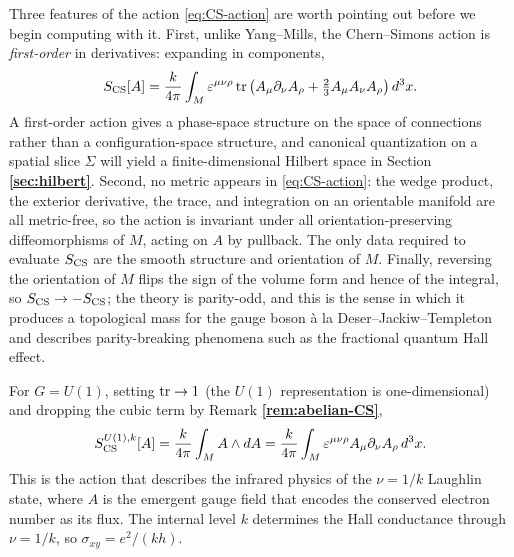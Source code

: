 \noindent Three features of the action \eqref{eq:CS-action} are worth pointing out before we begin computing with it. First, unlike Yang--Mills, the Chern--Simons action is \emph{first-order} in derivatives: expanding in components,
\begin{equation}\label{eq:CS-components}
S_{\operatorname{CS}}[A] = \frac{k}{4\pi}\int_M \varepsilon^{\mu\nu\rho}\operatorname{tr}\left(A_\mu \partial_\nu A_\rho + \tfrac{2}{3}A_\mu A_\nu A_\rho\right)d^3 x.
\end{equation}
A first-order action gives a phase-space structure on the space of connections rather than a configuration-space structure, and canonical quantization on a spatial slice $\Sigma$ will yield a finite-dimensional Hilbert space in Section \textbf{\ref{sec:hilbert}}. Second, no metric appears in \eqref{eq:CS-action}: the wedge product, the exterior derivative, the trace, and integration on an orientable manifold are all metric-free, so the action is invariant under all orientation-preserving diffeomorphisms of $M$, acting on $A$ by pullback. The only data required to evaluate $S_{\operatorname{CS}}$ are the smooth structure and orientation of $M$. Finally, reversing the orientation of $M$ flips the sign of the volume form and hence of the integral, so $S_{\operatorname{CS}}\to -S_{\operatorname{CS}}$; the theory is parity-odd, and this is the sense in which it produces a topological mass for the gauge boson \`a la Deser--Jackiw--Templeton \cite{DeserJackiwTempleton1982} and describes parity-breaking phenomena such as the fractional quantum Hall effect.

\begin{example}\label{ex:U1-action}
For $G = U(1)$, setting $\operatorname{tr} \to 1$ (the $U(1)$ representation is one-dimensional) and dropping the cubic term by Remark \textbf{\ref{rem:abelian-CS}},
\begin{equation}\label{eq:U1-action}
S_{\operatorname{CS}}^{U(1),k}[A] = \frac{k}{4\pi}\int_M A\wedge dA = \frac{k}{4\pi}\int_M \varepsilon^{\mu\nu\rho}A_\mu \partial_\nu A_\rho\, d^3 x.
\end{equation}
This is the action that describes the infrared physics of the $\nu = 1/k$ Laughlin state, where $A$ is the emergent gauge field that encodes the conserved electron number as its flux. The internal level $k$ determines the Hall conductance through $\nu = 1/k$, so $\sigma_{xy} = e^2/(kh)$.
\end{example}

